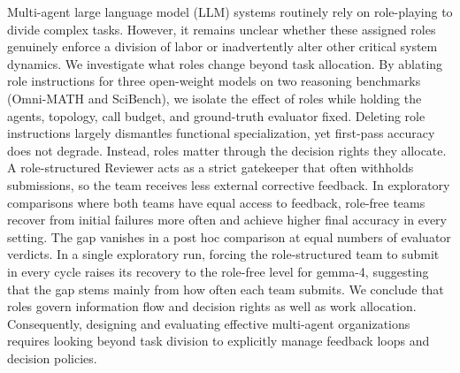 Multi-agent large language model (LLM) systems routinely rely on
role-playing to divide complex tasks. However, it remains unclear whether
these assigned roles genuinely enforce a division of labor or inadvertently
alter other critical system dynamics. We investigate what roles change
beyond task allocation. By ablating role instructions for three open-weight
models on two reasoning benchmarks (Omni-MATH and SciBench), we isolate the
effect of roles while holding the agents, topology, call budget, and
ground-truth evaluator fixed. Deleting role instructions largely dismantles
functional specialization, yet first-pass accuracy does not degrade.
Instead, roles matter through the decision rights they allocate. A
role-structured Reviewer acts as a strict gatekeeper that often withholds
submissions, so the team receives less external corrective feedback. In
exploratory comparisons where both teams have equal access to feedback,
role-free teams recover from initial failures more often and
achieve higher final accuracy in every setting. The gap vanishes in a post
hoc comparison at equal numbers of evaluator verdicts. In a single exploratory run,
forcing the role-structured team to submit in every cycle raises its
recovery to the role-free level for gemma-4, suggesting that the gap stems
mainly from how often each team submits. We conclude that roles govern information flow and decision
rights as well as work allocation. Consequently, designing and evaluating
effective multi-agent organizations requires looking beyond task division
to explicitly manage feedback loops and decision policies.
